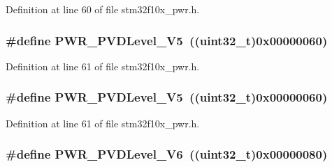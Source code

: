 Definition at line 60 of file stm32f10x\+\_\+pwr.\+h.

\subsubsection[{\texorpdfstring{P\+W\+R\+\_\+\+P\+V\+D\+Level\+\_\+2\+V5}{PWR_PVDLevel_2V5}}]{\setlength{\rightskip}{0pt plus 5cm}\#define P\+W\+R\+\_\+\+P\+V\+D\+Level\+\_\+V5~(({\bf uint32\+\_\+t})0x00000060)}\hypertarget{group___p_v_d__detection__level_gad91e74c3034a5baccca70250815e680e}{}\label{group___p_v_d__detection__level_gad91e74c3034a5baccca70250815e680e}


Definition at line 61 of file stm32f10x\+\_\+pwr.\+h.

\subsubsection[{\texorpdfstring{P\+W\+R\+\_\+\+P\+V\+D\+Level\+\_\+2\+V5}{PWR_PVDLevel_2V5}}]{\setlength{\rightskip}{0pt plus 5cm}\#define P\+W\+R\+\_\+\+P\+V\+D\+Level\+\_\+V5~(({\bf uint32\+\_\+t})0x00000060)}\hypertarget{group___p_v_d__detection__level_gad91e74c3034a5baccca70250815e680e}{}\label{group___p_v_d__detection__level_gad91e74c3034a5baccca70250815e680e}


Definition at line 61 of file stm32f10x\+\_\+pwr.\+h.

\subsubsection[{\texorpdfstring{P\+W\+R\+\_\+\+P\+V\+D\+Level\+\_\+2\+V6}{PWR_PVDLevel_2V6}}]{\setlength{\rightskip}{0pt plus 5cm}\#define P\+W\+R\+\_\+\+P\+V\+D\+Level\+\_\+V6~(({\bf uint32\+\_\+t})0x00000080)}\hypertarget{group___p_v_d__detection__level_ga46174e5288082b59473068a3ca8e8ea6}{}\label{group___p_v_d__detection__level_ga46174e5288082b59473068a3ca8e8ea6}


